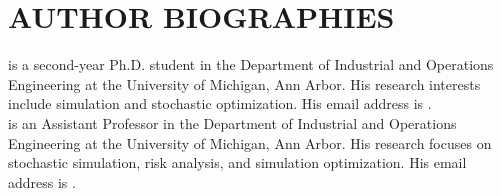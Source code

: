 \documentclass{wscpaperproc}
\theoremstyle{wsc}
\begin{document}













\section*{AUTHOR BIOGRAPHIES}
 is a second-year Ph.D. student in the Department of Industrial and Operations Engineering at the University of Michigan, Ann Arbor. His research interests include simulation and stochastic optimization. His email address is .\\

 is an Assistant Professor in the Department of Industrial and Operations Engineering at the University of Michigan, Ann Arbor. His research focuses on stochastic simulation, risk analysis, and
simulation optimization. His email address is .\\
\end{document}
